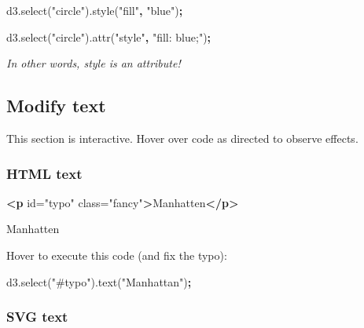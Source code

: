 \documentclass[openany]{book}
\newenvironment{Shaded}{\begin{snugshade}}{\end{snugshade}}
\newcommand{\AttributeTok}[1]{\textcolor[rgb]{0.77,0.63,0.00}{#1}}
\newcommand{\KeywordTok}[1]{\textcolor[rgb]{0.13,0.29,0.53}{\textbf{#1}}}
\newcommand{\NormalTok}[1]{#1}
\newcommand{\OperatorTok}[1]{\textcolor[rgb]{0.81,0.36,0.00}{\textbf{#1}}}
\newcommand{\OtherTok}[1]{\textcolor[rgb]{0.56,0.35,0.01}{#1}}
\newcommand{\StringTok}[1]{\textcolor[rgb]{0.31,0.60,0.02}{#1}}
\newcommand{\VariableTok}[1]{\textcolor[rgb]{0.00,0.00,0.00}{#1}}
\begin{document}
\begin{Shaded}
\begin{Highlighting}[]
\VariableTok{d3}\NormalTok{.}\AttributeTok{select}\NormalTok{(}\StringTok{"circle"}\NormalTok{).}\AttributeTok{style}\NormalTok{(}\StringTok{"fill"}\OperatorTok{,} \StringTok{"blue"}\NormalTok{)}\OperatorTok{;}

\VariableTok{d3}\NormalTok{.}\AttributeTok{select}\NormalTok{(}\StringTok{"circle"}\NormalTok{).}\AttributeTok{attr}\NormalTok{(}\StringTok{"style"}\OperatorTok{,} \StringTok{"fill: blue;"}\NormalTok{)}\OperatorTok{;}
\end{Highlighting}
\end{Shaded}

\emph{In other words, style is an attribute!}

\hypertarget{modify-text}{%
\subsection{Modify text}\label{modify-text}}

This section is interactive. Hover over code as directed to observe effects.

\hypertarget{html-text}{%
\subsubsection*{HTML text}\label{html-text}}

\begin{Shaded}
\begin{Highlighting}[]
\KeywordTok{<p}\OtherTok{ id=}\StringTok{"typo"}\OtherTok{ class=}\StringTok{"fancy"}\KeywordTok{>}\NormalTok{Manhatten}\KeywordTok{</p>}
\end{Highlighting}
\end{Shaded}

Manhatten

Hover to execute this code (and fix the typo):

\hypertarget{fixtypo}{}
\begin{Shaded}
\begin{Highlighting}[]
\VariableTok{d3}\NormalTok{.}\AttributeTok{select}\NormalTok{(}\StringTok{"#typo"}\NormalTok{).}\AttributeTok{text}\NormalTok{(}\StringTok{"Manhattan"}\NormalTok{)}\OperatorTok{;}
\end{Highlighting}
\end{Shaded}

\hypertarget{svg-text}{%
\subsubsection*{SVG text}\label{svg-text}}
\end{document}
